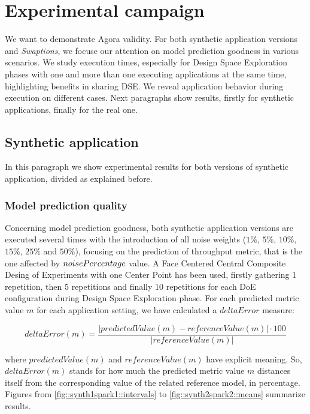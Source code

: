\section{Experimental campaign}\label{campaign}

We want to demonstrate Agora validity. For both synthetic application versions and \textit{Swaptions}, we focuse our attention on model prediction goodness in various scenarios. We study execution times, especially for Design Space Exploration phases with one and more than one executing applications at the same time, highlighting benefits in sharing DSE. We reveal application behavior during execution on different cases. Next paragraphs show results, firstly for synthetic applications, finally for the real one.


\subsection{Synthetic application}

In this paragraph we show experimental results for both versions of synthetic application, divided as explained before.


\subsubsection{Model prediction quality}\label{deltaErrorExplanation}

Concerning model prediction goodness, both synthetic application versions are executed several times with the introduction of all noise weights ($1\%$, $5\%$, $10\%$, $15\%$, $25\%$ and $50\%$), focusing on the prediction of throughput metric, that is the one affected by $noise\-Percentage$ value. A Face Centered Central Composite Desing of Experiments with one Center Point has been used, firstly gathering 1 repetition, then 5 repetitions and finally 10 repetitions for each DoE configuration during Design Space Exploration phase. For each predicted metric value $m$ for each application setting, we have calculated a $deltaError$ measure:

\[
deltaError(m) = \dfrac{\left\vert predictedValue(m) - referenceValue(m) \right\vert \cdot 100}{\left\vert referenceValue(m) \right\vert}
\]

where $predictedValue(m)$ and $referenceValue(m)$ have explicit meaning. So, $deltaError(m)$ stands for how much the predicted metric value $m$ distances itself from the corresponding value of the related reference model, in percentage. Figures from \ref{fig::synth1spark1::intervals} to \ref{fig::synth2spark2::means} summarize results.






